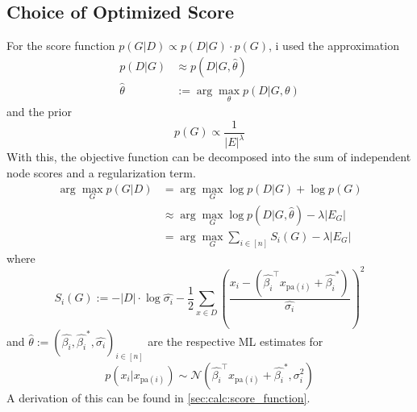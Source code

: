 \documentclass[sigconf, fleqn, prologue, dvipsnames]{acmart}
\newcommand{\abs}[1]{\left\vert #1 \right\vert}
\def\T{\top}
\def\pa{\text{pa}}
\begin{document}
\subsection{Choice of Optimized Score}
For the score function $p(G | D) \propto p(D | G) \cdot p(G)$, i used the approximation
\begin{align*}
	p(D | G)     & \approx p(D | G, \hat{\theta})               \\
	\hat{\theta} & := \arg\max\limits_{\theta} p(D | G, \theta)
\end{align*}
and the prior
$$p(G) \propto \frac{1}{|E|^\lambda}$$
With this, the objective function can be decomposed into the sum of independent node scores and a regularization term.
\begin{align*}
	\arg\max\limits_G p(G | D) & = \arg\max\limits_G \log p(D | G) + \log p(G)                             \\
	                           & \approx \arg\max\limits_G \log p(D | G, \hat{\theta}) - \lambda \abs{E_G} \\
	                           & = \arg\max\limits_G \sum\limits_{i \in [n]} S_i(G) - \lambda \abs{E_G}
\end{align*}
where
$$S_i(G) := -\abs{D} \cdot \log \hat{\sigma_i} - \frac{1}{2} \sum\limits_{x \in D} \left(\frac{x_i - (\hat{\beta_i}^\T x_{\pa(i)} + \hat{\beta_i}^*)}{\hat{\sigma_i}}\right)^2$$
and $\hat{\theta} := \left(\hat{\beta_i}, \hat{\beta_i}^*, \hat{\sigma_i}\right)_{i \in [n]}$ are the respective ML estimates for
$$p(x_i | x_{\pa(i)}) \sim \mathcal{N}(\hat{\beta_i}^\T x_{\pa(i)} + \hat{\beta_i}^*, \sigma_i^2)$$
A derivation of this can be found in \autoref{sec:calc:score_function}.
\end{document}

